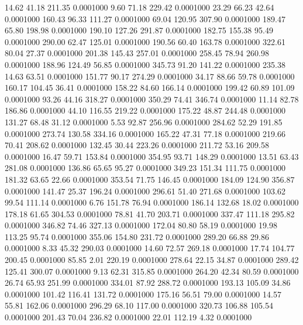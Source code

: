   14.62   41.18  211.35   0.0001000
   9.60   71.18  229.42   0.0001000
  23.29   66.23   42.64   0.0001000
 160.43   96.33  111.27   0.0001000
  69.04  120.95  307.90   0.0001000
 189.47   65.80  198.98   0.0001000
 190.10  127.26  291.87   0.0001000
 182.75  155.38   95.49   0.0001000
 290.00   62.47  125.01   0.0001000
 190.56   60.40  163.78   0.0001000
 322.61   80.04   27.37   0.0001000
 201.38  145.43  257.01   0.0001000
 258.45   78.94  260.98   0.0001000
 188.96  124.49   56.85   0.0001000
 345.73   91.20  141.22   0.0001000
 235.38   14.63   63.51   0.0001000
 151.77   90.17  274.29   0.0001000
  34.17   88.66   59.78   0.0001000
 160.17  104.45   36.41   0.0001000
 158.22   84.60  166.14   0.0001000
 199.42   60.89  101.09   0.0001000
  93.26   44.16  318.27   0.0001000
 350.29   74.41  346.74   0.0001000
  11.14   82.78  186.86   0.0001000
  44.10  116.55  219.22   0.0001000
 175.22   48.87  244.48   0.0001000
 131.27   68.48   31.12   0.0001000
   5.53   92.87  256.96   0.0001000
 284.62   52.29  191.85   0.0001000
 273.74  130.58  334.16   0.0001000
 165.22   47.31   77.18   0.0001000
 219.66   70.41  208.62   0.0001000
 132.45   30.44  223.26   0.0001000
 211.72   53.16  209.58   0.0001000
  16.47   59.71  153.84   0.0001000
 354.95   93.71  148.29   0.0001000
  13.51   63.43  281.08   0.0001000
 136.86   65.65   95.27   0.0001000
 349.23  151.34  111.75   0.0001000
 181.32   63.65   22.66   0.0001000
 353.54   71.75  146.45   0.0001000
 184.09  124.90  356.87   0.0001000
 141.47   25.37  196.24   0.0001000
 296.61   51.40  271.68   0.0001000
 103.62   99.54  111.14   0.0001000
   6.76  151.78   76.94   0.0001000
 186.14  132.68   18.02   0.0001000
 178.18   61.65  304.53   0.0001000
  78.81   41.70  203.71   0.0001000
 337.47  111.18  295.82   0.0001000
 346.82   74.46  327.13   0.0001000
 172.04   80.80   58.19   0.0001000
  19.98  113.25   95.74   0.0001000
 355.06  154.80  231.72   0.0001000
 289.20   66.88   29.86   0.0001000
   8.33   45.32  290.03   0.0001000
  14.60   72.57  269.18   0.0001000
  17.74  104.77  200.45   0.0001000
  85.85    2.01  220.19   0.0001000
 278.64   22.15   34.87   0.0001000
 289.42  125.41  300.07   0.0001000
   9.13   62.31  315.85   0.0001000
 264.20   42.34   80.59   0.0001000
  26.74   65.93  251.99   0.0001000
 334.01   87.92  288.72   0.0001000
 193.13  105.09   34.86   0.0001000
 101.42  116.41  131.72   0.0001000
 175.16   56.51   79.00   0.0001000
  14.57   55.81  162.06   0.0001000
 296.29   68.10  117.00   0.0001000
 320.73  106.88  105.54   0.0001000
 201.43   70.04  236.82   0.0001000
  22.01  112.19    4.32   0.0001000
